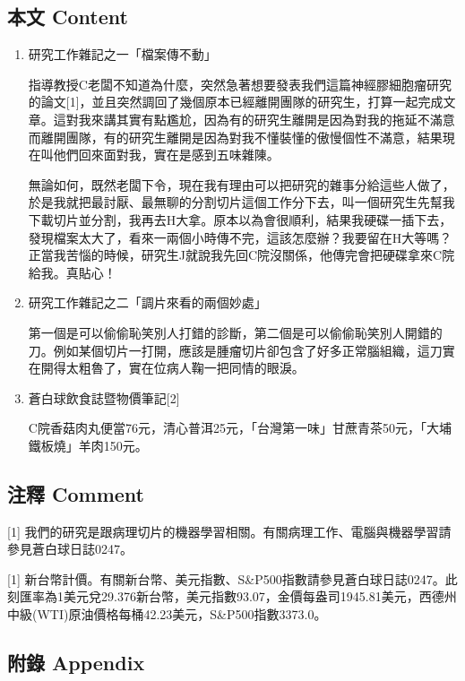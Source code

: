 \documentclass[a5paper, 11pt
]{book}
\begin{document}
\hypertarget{ux672cux6587-content-74}{%
\subsection{本文 Content}\label{ux672cux6587-content-74}}

\begin{enumerate}
\def\labelenumi{\arabic{enumi}.}
\item
  研究工作雜記之一「檔案傳不動」

  指導教授C老闆不知道為什麼，突然急著想要發表我們這篇神經膠細胞瘤研究的論文{[}1{]}，並且突然調回了幾個原本已經離開團隊的研究生，打算一起完成文章。這對我來講其實有點尷尬，因為有的研究生離開是因為對我的拖延不滿意而離開團隊，有的研究生離開是因為對我不懂裝懂的傲慢個性不滿意，結果現在叫他們回來面對我，實在是感到五味雜陳。

  無論如何，既然老闆下令，現在我有理由可以把研究的雜事分給這些人做了，於是我就把最討厭、最無聊的分割切片這個工作分下去，叫一個研究生先幫我下載切片並分割，我再去H大拿。原本以為會很順利，結果我硬碟一插下去，發現檔案太大了，看來一兩個小時傳不完，這該怎麼辦？我要留在H大等嗎？正當我苦惱的時候，研究生J就說我先回C院沒關係，他傳完會把硬碟拿來C院給我。真貼心！
\item
  研究工作雜記之二「調片來看的兩個妙處」

  第一個是可以偷偷恥笑別人打錯的診斷，第二個是可以偷偷恥笑別人開錯的刀。例如某個切片一打開，應該是腫瘤切片卻包含了好多正常腦組織，這刀實在開得太粗魯了，實在位病人鞠一把同情的眼淚。
\item
  蒼白球飲食誌暨物價筆記{[}2{]}

  C院香菇肉丸便當76元，清心普洱25元，「台灣第一味」甘蔗青茶50元，「大埔鐵板燒」羊肉150元。
\end{enumerate}

\hypertarget{ux6ce8ux91cb-comment-74}{%
\subsection{注釋 Comment}\label{ux6ce8ux91cb-comment-74}}

{[}1{]}
我們的研究是跟病理切片的機器學習相關。有關病理工作、電腦與機器學習請參見蒼白球日誌0247。

{[}1{]}
新台幣計價。有關新台幣、美元指數、S\&P500指數請參見蒼白球日誌0247。此刻匯率為1美元兌29.376新台幣，美元指數93.07，金價每盎司1945.81美元，西德州中級(WTI)原油價格每桶42.23美元，S\&P500指數3373.0。

\hypertarget{ux9644ux9304-appendix-74}{%
\subsection{附錄 Appendix}\label{ux9644ux9304-appendix-74}}
\end{document}
